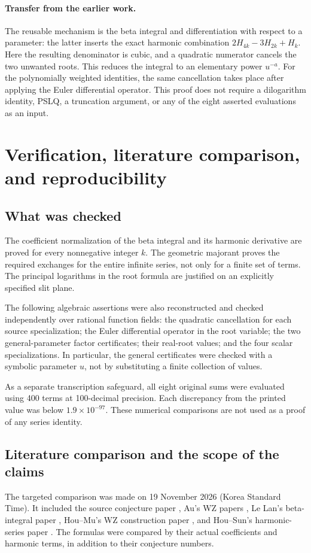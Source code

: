 \documentclass[11pt,a4paper]{article}
\theoremstyle{remark}\newtheorem{remark}[theorem]{Remark}
\numberwithin{equation}{section}
\begin{document}
\paragraph{Transfer from the earlier work.}
The reusable mechanism is the beta integral and differentiation with
respect to a parameter: the latter inserts the exact harmonic combination
$2H_{4k}-3H_{2k}+H_k$. Here the resulting denominator is cubic, and a
quadratic numerator cancels the two unwanted roots. This reduces the
integral to an elementary power $u^{-a}$. For the polynomially weighted
identities, the same cancellation takes place after applying the Euler
differential operator. This proof does not require a dilogarithm identity,
PSLQ, a truncation argument, or any of the eight asserted evaluations as
an input.

\section{Verification, literature comparison, and reproducibility}

\subsection{What was checked}
The coefficient normalization of the beta integral and its harmonic
derivative are proved for every nonnegative integer $k$. The geometric
majorant proves the required exchanges for the entire infinite series,
not only for a finite set of terms. The principal logarithms in the root
formula are justified on an explicitly specified slit plane.

The following algebraic assertions were also reconstructed and checked
independently over rational function fields: the quadratic cancellation
for each source specialization; the Euler differential operator in the
root variable; the two general-parameter factor certificates; their
real-root values; and the four scalar specializations. In particular,
the general certificates were checked with a symbolic parameter $u$,
not by substituting a finite collection of values.

As a separate transcription safeguard, all eight original sums were
evaluated using 400 terms at 100-decimal precision. Each discrepancy
from the printed value was below $1.9\times10^{-97}$. These numerical
comparisons are not used as a proof of any series identity.

\subsection{Literature comparison and the scope of the claims}
The targeted comparison was made on 19 November 2026 (Korea Standard
Time). It included the source conjecture paper \cite{Sun}, Au's WZ
papers \cite{Au2023,Au2024,Au2026}, Le Lan's beta-integral paper
\cite{LeLan}, Hou--Mu's WZ construction paper \cite{HouMu}, and
Hou--Sun's harmonic-series paper \cite{HouSun}.
The formulas were compared by their actual coefficients and harmonic
terms, in addition to their conjecture numbers.
\end{document}
